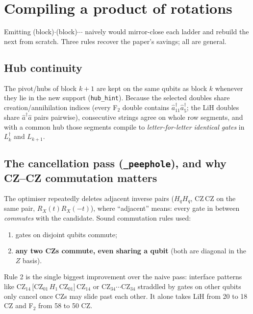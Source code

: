 \documentclass[11pt]{article}
\newcommand{\RX}{R_X}
\newcommand{\CZ}{\mathrm{CZ}}
\newcommand{\code}[1]{\texttt{#1}}
\begin{document}
\section{Compiling a product of rotations}
\label{sec:multi}
Emitting (block)$\cdot$(block)$\cdots$ naively would mirror-close each
ladder and rebuild the next from scratch. Three rules recover the
paper's savings; all are general.

\subsection{Hub continuity}
The pivot/hubs of block $k{+}1$ are kept on the same qubits as block $k$
whenever they lie in the new support (\code{hub\_hint}). Because the
selected doubles share creation/annihilation indices (every F$_2$ double
contains $\hat a^{\dagger}_{11}\hat a^{\dagger}_5$; the LiH doubles share
$\hat a^{\dagger}\hat a$ pairs pairwise), consecutive strings agree on
whole row segments, and with a common hub those segments compile to
\emph{letter-for-letter identical gates} in $L_k^{\dagger}$ and $L_{k+1}$.

\subsection{The cancellation pass (\code{\_peephole}), and why CZ--CZ
commutation matters}
The optimiser repeatedly deletes adjacent inverse pairs
($H_qH_q$, $\CZ\,\CZ$ on the same pair,
$\RX(t)\RX(-t)$), where ``adjacent'' means: every gate in between
\emph{commutes} with the candidate. Sound commutation rules used:
\begin{enumerate}
\item gates on disjoint qubits commute;
\item \textbf{any two CZs commute, even sharing a qubit} (both are
  diagonal in the $Z$ basis).
\end{enumerate}
Rule 2 is the single biggest improvement over the naive pass: interface
patterns like
$\CZ_{14}\,\big[\CZ_{01}\,H_1\,\CZ_{01}\big]\,\CZ_{14}$ or
$\CZ_{34}\cdots\CZ_{34}$ straddled by gates on other qubits only cancel
once CZs may slide past each other. It alone takes LiH from 20 to 18 CZ
and F$_2$ from 58 to 50 CZ.
\end{document}
